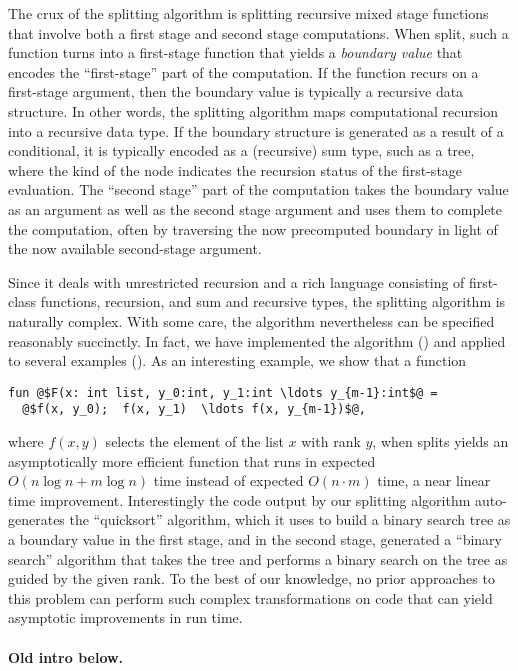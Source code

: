 The crux of the splitting algorithm is splitting recursive mixed stage
functions that involve both a first stage and second stage
computations.  When split, such a function turns into a first-stage
function that yields a {\em boundary value} that encodes the
``first-stage'' part of the computation.  If the function recurs on a
first-stage argument, then the boundary value is typically a recursive
data structure.  In other words, the splitting algorithm maps
computational recursion into a recursive data type. If the boundary
structure is generated as a result of a conditional, it is typically
encoded as a (recursive) sum type, such as a tree, where the kind of
the node indicates the recursion status of the first-stage evaluation.
The ``second stage'' part of the computation takes the boundary value
as an argument as well as the second stage argument and uses them to
complete the computation, often by traversing the now precomputed
boundary in light of the now available second-stage argument.

Since it deals with unrestricted recursion and a rich language
consisting of first-class functions, recursion, and sum and recursive
types, the splitting algorithm is naturally complex. With some care,
the algorithm nevertheless can be specified reasonably succinctly.  In
fact, we have implemented the algorithm () and
applied to several examples ().  As an interesting
example, we show that a function 
\begin{lstlisting}
fun @$F(x: int list, y_0:int, y_1:int \ldots y_{m-1}:int$@ = 
  @$f(x, y_0);  f(x, y_1)  \ldots f(x, y_{m-1})$@,
\end{lstlisting}
where $f(x,y)$ selects the element of the list $x$ with rank $y$, when
splits yields an asymptotically more efficient function that runs in
expected $O(n\log{n} + m\log{n})$ time instead of expected $O(n \cdot
m)$ time, a near linear time improvement.  Interestingly the code
output by our splitting algorithm auto-generates the ``quicksort''
algorithm, which it uses to build a binary search tree as a boundary
value in the first stage, and in the second stage, generated a
``binary search'' algorithm that takes the tree and performs a binary
search on the tree as guided by the given rank.  To the best of our
knowledge, no prior approaches to this problem can perform such
complex transformations on code that can yield asymptotic
improvements in run time.


\paragraph{Old intro below.}

